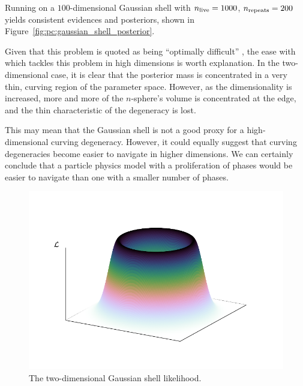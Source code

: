 Running \PolyChord{} on a \(100\)-dimensional Gaussian shell with \(n_{\mathrm{live}}=1000\), \(n_{\mathrm{repeats}}=200\) yields consistent evidences and posteriors, shown in Figure~\ref{fig:pc:gaussian_shell_posterior}. 
                                                                  
Given that this problem is quoted as being ``optimally difficult'' \citep{MultiNest2}, the ease with which \PolyChord{} tackles this problem in high dimensions is worth explanation. In the two-dimensional case, it is clear that the posterior mass is concentrated in a very thin, curving region of the parameter space. However, as the dimensionality is increased, more and more of the \(n\)-sphere's volume is concentrated at the edge, and the thin characteristic of the degeneracy is lost. 

This may mean that the Gaussian shell is not a good proxy for a high-dimensional curving degeneracy. However, it could equally suggest that curving degeneracies become easier to navigate in higher dimensions. We can certainly conclude that a particle physics model with a proliferation of phases would be easier to navigate than one with a smaller number of phases.


\begin{figure}[tp]
  \centering
  \includegraphics[width=\columnwidth]{chapters/polychord/figures/gaussian_shell}
  \caption{The two-dimensional Gaussian shell likelihood.\label{fig:pc:gaussian_shell}}
\end{figure}

